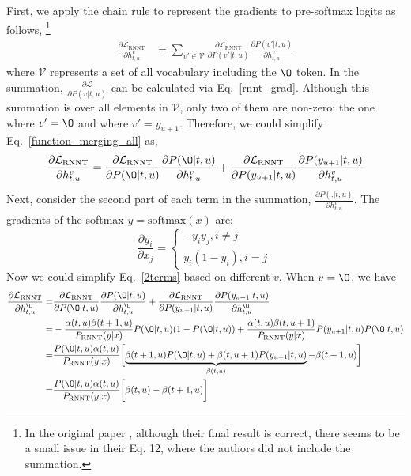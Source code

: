 \documentclass{article}
\begin{document}
First, we apply the chain rule
to represent the gradients to pre-softmax logits as follows, \footnote{In the original paper \cite{li2019improving}, although their final result is correct, there seems to be a small issue in their Eq. 12, where the authors did not include the summation.}
\begin{align}
\label{function_merging_all}
    \frac{\partial{\mathcal{L}_\text{RNNT}}}{\partial{h_{t, u}^v}} &= \sum_{v' \in \mathcal{V}  } \frac{\partial{\mathcal{L}_\text{RNNT}}}{\partial{P(v'| t, u)}} \frac{\partial{P(v'| t, u)}}{\partial{h_{t, u}^v}} \end{align}
where $\mathcal{V}$ represents a set of all vocabulary including the $\O$ token.
In the summation, $\frac{\partial{\mathcal{L}}}{\partial{P(v| t, u)}}$ can be calculated via Eq.~\ref{rnnt_grad}. Although this summation is over all elements in $\mathcal{V}$, only two of them are non-zero: the one where $v' = \O$ and where $v' = y_{u+1}$. Therefore, we could simplify Eq.~\ref{function_merging_all} as, 
\begin{equation}
\label{2terms}
\frac{\partial{\mathcal{L}_\text{RNNT}}}{\partial{h_{t, u}^v}} = \frac{\partial{\mathcal{L}_\text{RNNT}}}{\partial{P(\O| t, u)}} \frac{\partial{P(\O| t, u)}}{\partial{h_{t, u}^v}} + \frac{\partial{\mathcal{L}_\text{RNNT}}}{\partial{P(y_{u+1}| t, u)}} \frac{\partial{P(y_{u+1}| t, u)}}{\partial{h_{t, u}^v}}
\end{equation}
Next, consider the second part of each term in the summation,  $\frac{\partial{P(.| t, u)}}{\partial{h_{t, u}^v}}$. The gradients of the softmax  $y = \text{softmax}(x)$ are:
\begin{equation}
    \frac{\partial y_i}{\partial x_j} = \begin{cases}
        -y_i y_j, i \neq j \\
        y_i (1 - y_i) , i = j \
    \end{cases}
\end{equation}
Now we could simplify Eq.~\ref{2terms} based on different $v$. When $v = \O$, we have
\begin{equation}
\label{2terms_blank}
\begin{aligned}
\frac{\partial{\mathcal{L}_\text{RNNT}}}{\partial{h_{t, u}^{\O}}}  = & \frac{\partial{\mathcal{L}_\text{RNNT}}}{\partial{P(\O| t, u)}} \frac{\partial{P(\O| t, u)}}{\partial{h_{t, u}^{\O}}} + \frac{\partial{\mathcal{L}}_\text{RNNT}}{\partial{P(y_{u+1}| t, u)}} \frac{\partial{P(y_{u+1}| t, u)}}{\partial{h_{t, u}^{\O}}} \\
 = & -\frac{\alpha(t, u)\beta{(t+1,u)}}{P_\text{RNNT}(y|x)} P(\O| t, u) (1 - P(\O| t, u))  +\frac{\alpha(t, u)\beta{(t,u+1)}}{P_\text{RNNT}(y|x)} P(y_{u+1}| t, u)  P(\O| t, u) \\
= & \frac{P(\O|t, u) \alpha(t,u) }{P_\text{RNNT}(y|x)} \biggl[\underbrace{\beta(t+1, u) P(\O| t, u)  + \beta(t, u+1) P(y_{u+1} | t, u)}_{\beta(t, u)} -\beta(t+1, u) \biggr] \\
= & \frac{P(\O|t, u) \alpha(t,u) }{P_\text{RNNT}(y|x)} \biggl[\beta(t, u)-\beta(t+1, u)  \biggr] \\
\end{aligned}
\end{equation}
\end{document}

